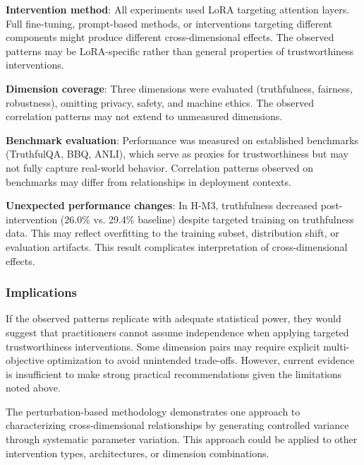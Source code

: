 \textbf{Intervention method}: All experiments used LoRA targeting attention layers. Full fine-tuning, prompt-based methods, or interventions targeting different components might produce different cross-dimensional effects. The observed patterns may be LoRA-specific rather than general properties of trustworthiness interventions.

\textbf{Dimension coverage}: Three dimensions were evaluated (truthfulness, fairness, robustness), omitting privacy, safety, and machine ethics. The observed correlation patterns may not extend to unmeasured dimensions.

\textbf{Benchmark evaluation}: Performance was measured on established benchmarks (TruthfulQA, BBQ, ANLI), which serve as proxies for trustworthiness but may not fully capture real-world behavior. Correlation patterns observed on benchmarks may differ from relationships in deployment contexts.

\textbf{Unexpected performance changes}: In H-M3, truthfulness decreased post-intervention (26.0\% vs. 29.4\% baseline) despite targeted training on truthfulness data. This may reflect overfitting to the training subset, distribution shift, or evaluation artifacts. This result complicates interpretation of cross-dimensional effects.

\subsubsection{Implications}

If the observed patterns replicate with adequate statistical power, they would suggest that practitioners cannot assume independence when applying targeted trustworthiness interventions. Some dimension pairs may require explicit multi-objective optimization to avoid unintended trade-offs. However, current evidence is insufficient to make strong practical recommendations given the limitations noted above.

The perturbation-based methodology demonstrates one approach to characterizing cross-dimensional relationships by generating controlled variance through systematic parameter variation. This approach could be applied to other intervention types, architectures, or dimension combinations.
